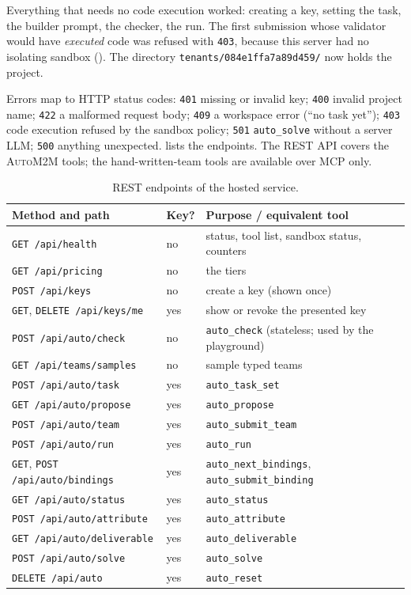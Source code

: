 \documentclass[10pt,a4paper]{article}
\newcommand{\auto}{\textsc{AutoM2M}}
\newcommand{\code}[1]{\texttt{#1}}
\newcommand{\file}[1]{\texttt{#1}}
\newcommand{\mcptool}[1]{\texttt{#1}}
\begin{document}
Everything that needs no code execution worked: creating a key, setting the
task, the builder prompt, the checker, the run. The first submission whose
validator would have \emph{executed} code was refused with \code{403},
because this server had no isolating sandbox (). The
directory \file{tenants/084e1ffa7a89d459/} now holds the project.

Errors map to HTTP status codes: \code{401} missing or invalid key;
\code{400} invalid project name; \code{422} a malformed request body;
\code{409} a workspace error (``no task yet''); \code{403} code execution
refused by the sandbox policy; \code{501} \mcptool{auto\_solve} without a
server LLM; \code{500} anything unexpected.  lists the
endpoints. The REST API covers the \auto{} tools; the hand-written-team tools
are available over MCP only.

\begin{table}[!htb]
\centering\small
\caption{REST endpoints of the hosted service.}
\label{tab:rest}
\begin{tabularx}{\textwidth}{@{}l l Y@{}}
\toprule
{}Method and path & Key? & Purpose / equivalent tool \\
\midrule
\code{GET /api/health} & no & status, tool list, sandbox status, counters \\
\code{GET /api/pricing} & no & the tiers \\
\code{POST /api/keys} & no & create a key (shown once) \\
\code{GET}, \code{DELETE /api/keys/me} & yes & show or revoke the presented key \\
\code{POST /api/auto/check} & no & \mcptool{auto\_check} (stateless; used by the playground) \\
\code{GET /api/teams/samples} & no & sample typed teams \\
\code{POST /api/auto/task} & yes & \mcptool{auto\_task\_set} \\
\code{GET /api/auto/propose} & yes & \mcptool{auto\_propose} \\
\code{POST /api/auto/team} & yes & \mcptool{auto\_submit\_team} \\
\code{POST /api/auto/run} & yes & \mcptool{auto\_run} \\
\code{GET}, \code{POST /api/auto/bindings} & yes & \mcptool{auto\_next\_bindings}, \mcptool{auto\_submit\_binding} \\
\code{GET /api/auto/status} & yes & \mcptool{auto\_status} \\
\code{POST /api/auto/attribute} & yes & \mcptool{auto\_attribute} \\
\code{GET /api/auto/deliverable} & yes & \mcptool{auto\_deliverable} \\
\code{POST /api/auto/solve} & yes & \mcptool{auto\_solve} \\
\code{DELETE /api/auto} & yes & \mcptool{auto\_reset} \\
\bottomrule
\end{tabularx}
\end{table}
\end{document}
